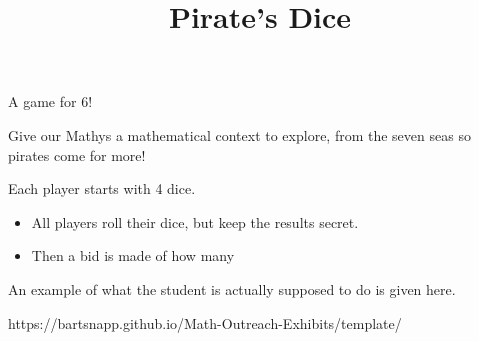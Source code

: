 \documentclass{../exhibit}
\title{Pirate's Dice}
\begin{document}
\begin{context}
  A game for 6!

  Give our Mathys a mathematical context to explore, from the seven
  seas  so pirates come for more!
\end{context}



\begin{directions}
  Each player starts with 4 dice.
  \begin{itemize}
  \item All players roll their dice, but keep the results secret.
  \item Then a bid is made of how many
  \end{itemize}
\end{directions}



\begin{example}
  An example of what the student is actually supposed to do is given
  here.
\end{example}



\begin{mathConnections}
  https://bartsnapp.github.io/Math-Outreach-Exhibits/template/
\end{mathConnections}
\end{document}
